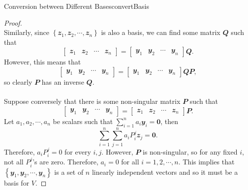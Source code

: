 \documentclass[math, code]{amznotes}
\theoremstyle{remark}
\newcommand{\zero}{\mathbf{0}}
\begin{document}
\begin{probox}{Conversion between Different Bases}{convertBasis}
\begin{proof}
\begin{equation*}
        \end{equation*}
        Similarly, since $\left\{\mathbfit{z}_1, \mathbfit{z}_2, \cdots, \mathbfit{z}_n\right\}$ is also a basis, we can find some matrix $\mathbfit{Q}$ such that 
        \begin{equation*}
            \begin{bmatrix}
                \mathbfit{z}_1 & \mathbfit{z}_2 & \cdots & \mathbfit{z}_n
            \end{bmatrix} = \begin{bmatrix}
                \mathbfit{y}_1 & \mathbfit{y}_2 & \cdots & \mathbfit{y}_n
            \end{bmatrix}\mathbfit{Q}.
        \end{equation*}
        However, this means that 
        \begin{equation*}
            \begin{bmatrix}
                \mathbfit{y}_1 & \mathbfit{y}_2 & \cdots & \mathbfit{y}_n
            \end{bmatrix} = \begin{bmatrix}
                \mathbfit{y}_1 & \mathbfit{y}_2 & \cdots & \mathbfit{y}_n
            \end{bmatrix}\mathbfit{QP},
        \end{equation*}
        so clearly $\mathbfit{P}$ has an inverse $\mathbfit{Q}$.
        \\\\
        Suppose conversely that there is some non-singular matrix $\mathbfit{P}$ such that 
        \begin{equation*}
            \begin{bmatrix}
                \mathbfit{y}_1 & \mathbfit{y}_2 & \cdots & \mathbfit{y}_n
            \end{bmatrix} = \begin{bmatrix}
                \mathbfit{z}_1 & \mathbfit{z}_2 & \cdots & \mathbfit{z}_n
            \end{bmatrix}\mathbfit{P}.
        \end{equation*}
        Let $a_1, a_2, \cdots, a_n$ be scalars such that $\sum_{i = 1}^{n}a_i\mathbfit{y}_i = \zero$, then 
        \begin{equation*}
            \sum_{i = 1}^{n}\sum_{j = 1}^{n}a_iP^j_i\mathbfit{z}_j = \zero.
        \end{equation*}
        Therefore, $a_iP^j_i = 0$ for every $i, j$. However, $\mathbfit{P}$ is non-singular, so for any fixed $i$, not all $P^j_i$'s are zero. Therefore, $a_i = 0$ for all $i = 1, 2, \cdots, n$. This implies that $\left\{\mathbfit{y}_1, \mathbfit{y}_2, \cdots, \mathbfit{y}_n\right\}$ is a set of $n$ linearly independent vectors and so it must be a basis for $V$.
    \end{proof}
\end{probox}
\end{document}
